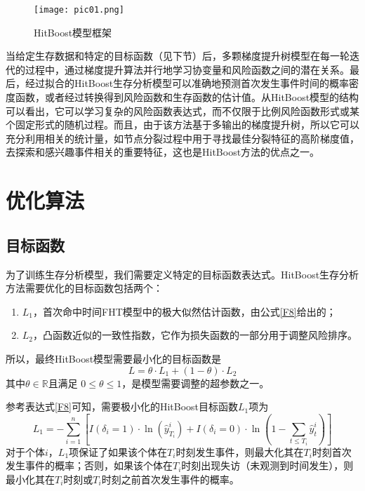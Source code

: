 \begin{figure}[h]
\texttt{[image: pic01.png]}
\caption{HitBoost模型框架}
\label{pic01}
\end{figure}

当给定生存数据和特定的目标函数（见下节）后，多颗梯度提升树模型在每一轮迭代的过程中，通过梯度提升算法并行地学习协变量和风险函数之间的潜在关系。最后，经过拟合的HitBoost生存分析模型可以准确地预测首次发生事件时间的概率密度函数，或者经过转换得到风险函数和生存函数的估计值。从HitBoost模型的结构可以看出，它可以学习复杂的风险函数表达式，而不仅限于比例风险函数形式或某个固定形式的随机过程。而且，由于该方法基于多输出的梯度提升树，所以它可以充分利用相关的统计量，如节点分裂过程中用于寻找最佳分裂特征的高阶梯度值，去探索和感兴趣事件相关的重要特征，这也是HitBoost方法的优点之一。

\section{优化算法}

\subsection{目标函数}

为了训练生存分析模型，我们需要定义特定的目标函数表达式。HitBoost生存分析方法需要优化的目标函数包括两个：
\begin{enumerate}
    \item $L_1$，首次命中时间FHT模型中的极大似然估计函数，由公式\eqref{F8}给出的；
    \item $L_2$，凸函数近似的一致性指数，它作为损失函数的一部分用于调整风险排序。
\end{enumerate}
所以，最终HitBoost模型需要最小化的目标函数是
\begin{equation}
L=\theta \cdot L_1 + (1-\theta) \cdot L_2 \label{F33}
\end{equation}
其中$\theta \in \mathbb{R}$且满足 $0 \le \theta \le 1$，是模型需要调整的超参数之一。
 
参考表达式\eqref{F8}可知，需要极小化的HitBoost目标函数$L_1$项为
\begin{equation}
L_1 = -\sum_{i=1}^{n} \left[ I(\delta_i=1)\cdot \ln(\hat{y}_{T_i}^i) + I(\delta_i=0)\cdot \ln(1-\sum_{t\le T_i}\hat{y}_t^i) \right]
\end{equation}
对于个体$i$，$L_1$项保证了如果该个体在$T_i$时刻发生事件，则最大化其在$T_i$时刻首次发生事件的概率；否则，如果该个体在$T_i$时刻出现失访（未观测到时间发生），则最小化其在$T_i$时刻或$T_i$时刻之前首次发生事件的概率。

